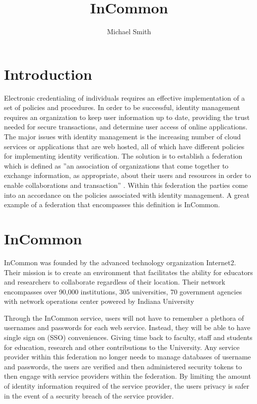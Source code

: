 \documentclass[9pt,twocolumn,twoside]{../../styles/osajnl}
\title{InCommon}
\author[1]{Michael Smith}
\affil[1]{School of Informatics and Computing, Bloomington, IN 47408, U.S.A.}
\affil[*]{Corresponding authors: mls35@iu.edu}
\begin{document}
\maketitle

\section{Introduction}

Electronic credentialing of individuals requires an effective
implementation of a set of policies and procedures.  In order to be
successful, identity management requires an organization to keep user
information up to date, providing the trust needed for secure
transactions, and determine user access of online applications.  The
major issues with identity management is the increasing number of
cloud services or applications that are web hosted, all of which have
different policies for implementing identity verification.  The
solution is to establish a federation which is defined as ''an association
of organizations that come together to exchange information, as
appropriate, about their users and resources in order to enable
collaborations and transaction'' \cite{www-incommonppt}.
Within this federation the parties come into an accordance on the
policies associated with identity management.  A great example of a
federation that encompasses this definition is InCommon.

\section{InCommon}

InCommon was founded by the advanced technology organization
Internet2.  Their mission is to create an environment that facilitates
the ability for educators and researchers to collaborate regardless of
their location.  Their network encompasses over 90,000 institutions,
305 universities, 70 government agencies with network operations
center powered by Indiana University \cite{www-internet2}

Through the InCommon service, users will not have to remember a
plethora of usernames and passwords for each web service.  Instead,
they will be able to have single sign on (SSO) conveniences.  Giving
time back to faculty, staff and students for education, research and
other contributions to the University.  Any service provider within
this federation no longer needs to manage databases of username and
passwords, the users are verified and then administered security
tokens to then engage with service providers within the federation.
By limiting the amount of identity information required of the service
provider, the users privacy is safer in the event of a security breach
of the service provider.
\end{document}
